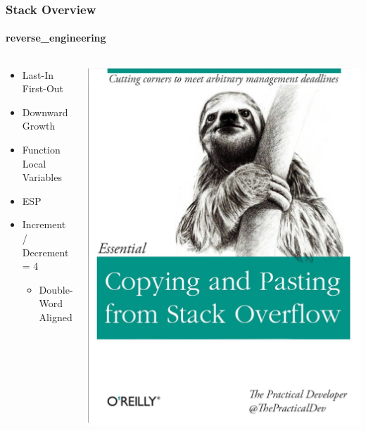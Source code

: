 \documentclass[aspectratio=169]{beamer}
\begin{document}
\begin{frame}
  \frametitle{Stack Overview}
  \framesubtitle{reverse\_engineering}
  \begin{columns}
    \begin{column}{.40\textwidth}
      \begin{itemize}
      \item{Last-In First-Out}
      \item{Downward Growth}
      \item{Function Local Variables}
      \item{ESP}
      \item{Increment / Decrement = 4}
        \begin{itemize}
        \item{Double-Word Aligned}
        \end{itemize}
      \end{itemize}
    \end{column}
    \hfill
    \begin{column}{.60\textwidth}
      \begin{center}
        \includegraphics[scale=0.09]{stack-overflow-meme}
      \end{center}
    \end{column}
  \end{columns}
  \end{frame}
\end{document}
